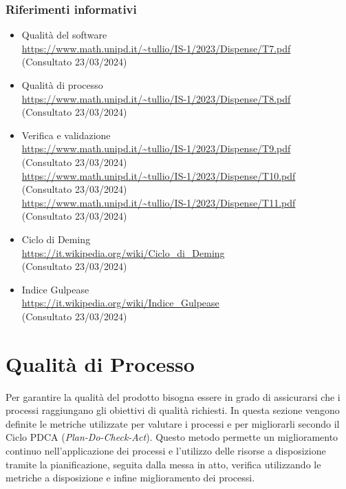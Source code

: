 \documentclass[5pt]{article}
\begin{document}
	\subsubsection{Riferimenti informativi}
	\begin{itemize}
		\item Qualità del software \\ \url{https://www.math.unipd.it/~tullio/IS-1/2023/Dispense/T7.pdf} \\ (Consultato 23/03/2024)
		\item Qualità di processo \\ \url{https://www.math.unipd.it/~tullio/IS-1/2023/Dispense/T8.pdf} \\ (Consultato 23/03/2024)
		\item Verifica e validazione \\
		\url{https://www.math.unipd.it/~tullio/IS-1/2023/Dispense/T9.pdf} \\ (Consultato 23/03/2024) \\
		\url{https://www.math.unipd.it/~tullio/IS-1/2023/Dispense/T10.pdf} \\ (Consultato 23/03/2024) \\
		\url{https://www.math.unipd.it/~tullio/IS-1/2023/Dispense/T11.pdf} \\ (Consultato 23/03/2024)
		\item Ciclo di Deming \\
		\url{https://it.wikipedia.org/wiki/Ciclo_di_Deming} \\ (Consultato 23/03/2024)
		\item Indice Gulpease \\
		\url{https://it.wikipedia.org/wiki/Indice_Gulpease} \\ (Consultato 23/03/2024)
	\end{itemize}
	
	
	
	\section{Qualità di Processo}
	Per garantire la qualità del prodotto bisogna essere in grado di assicurarsi che i processi raggiungano gli obiettivi di qualità richiesti. In questa sezione vengono definite le metriche utilizzate per valutare i processi e per migliorarli secondo il Ciclo PDCA (\textit{Plan-Do-Check-Act}). Questo metodo permette un miglioramento continuo nell’applicazione dei processi e l’utilizzo delle risorse a disposizione tramite la pianificazione, seguita dalla messa in atto, verifica utilizzando le metriche a disposizione e infine miglioramento dei processi.
	
\end{document}

